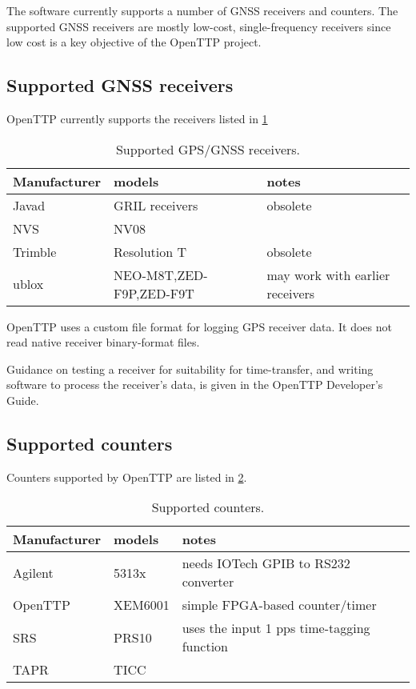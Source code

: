 The software currently supports a number of GNSS receivers and counters. 
The supported GNSS receivers are mostly low-cost, single-frequency receivers since low cost is a key objective of 
the OpenTTP project.
	
	\subsection{Supported GNSS receivers}
	
	OpenTTP currently supports the receivers listed in \ref{t:receivers}
	
	\begin{table}[h]
	\begin{tabular}{lll}
	Manufacturer & models & notes \\ \hline
	Javad & GRIL receivers & obsolete \\
	NVS   & NV08 & \\
	Trimble & Resolution T & obsolete\\
	ublox & NEO-M8T,ZED-F9P,ZED-F9T & may work with earlier receivers\\
	\end{tabular}
	\caption{Supported GPS/GNSS receivers.\label{t:receivers}}
	\end{table}
	
	OpenTTP uses a custom file format for logging GPS receiver data. 
	It does not read native receiver binary-format files.
	
	Guidance on testing a receiver for suitability for time-transfer, and writing software to process
	the receiver's data, is given in the OpenTTP Developer's Guide.
	
	\subsection{Supported counters}
	
	Counters supported by OpenTTP are listed in \ref{t:counters}.
	
	\begin{table}[h]
	\begin{tabular}{lll}
	Manufacturer & models & notes \\ \hline
	Agilent & 5313x &  needs IOTech GPIB to RS232 converter\\
	OpenTTP & XEM6001 & simple FPGA-based counter/timer \\
	SRS & PRS10 & uses the input 1 pps time-tagging function\\
	TAPR & TICC &\\
	\end{tabular}
	\caption{Supported counters. \label{t:counters}}
	\end{table}
	
